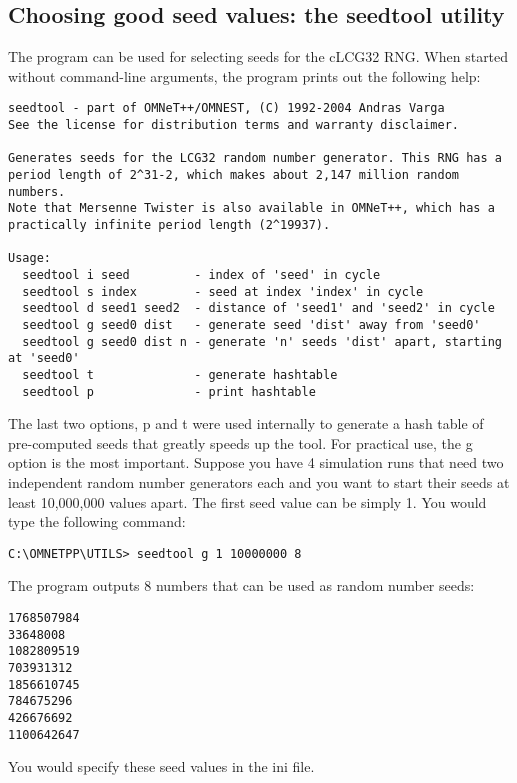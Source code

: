 \subsection{Choosing good seed values: the seedtool utility}
\label{sec:ch-run-sim:seedtool}

The  program can be used for selecting
seeds for the cLCG32 RNG. When started without command-line
arguments, the program prints out the following help:

\begin{verbatim}
seedtool - part of OMNeT++/OMNEST, (C) 1992-2004 Andras Varga
See the license for distribution terms and warranty disclaimer.

Generates seeds for the LCG32 random number generator. This RNG has a
period length of 2^31-2, which makes about 2,147 million random numbers.
Note that Mersenne Twister is also available in OMNeT++, which has a
practically infinite period length (2^19937).

Usage:
  seedtool i seed         - index of 'seed' in cycle
  seedtool s index        - seed at index 'index' in cycle
  seedtool d seed1 seed2  - distance of 'seed1' and 'seed2' in cycle
  seedtool g seed0 dist   - generate seed 'dist' away from 'seed0'
  seedtool g seed0 dist n - generate 'n' seeds 'dist' apart, starting at 'seed0'
  seedtool t              - generate hashtable
  seedtool p              - print hashtable
\end{verbatim}


The last two options, p and t were used internally to generate
a hash table of pre-computed seeds that greatly speeds up the
tool. For practical use, the g option is the most important.
Suppose you have 4 simulation runs that need two independent
random number generators each and you want to start their seeds
at least 10,000,000 values apart. The first seed value can be
simply 1. You would type the following command:

\begin{verbatim}
C:\OMNETPP\UTILS> seedtool g 1 10000000 8
\end{verbatim}


The program outputs 8 numbers that can be used as random number
seeds:

\begin{verbatim}
1768507984
33648008
1082809519
703931312
1856610745
784675296
426676692
1100642647
\end{verbatim}


You would specify these seed values in the ini file.



